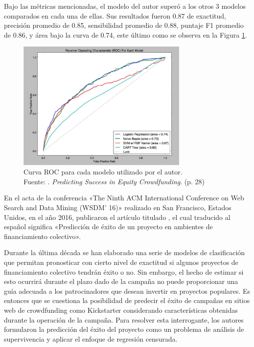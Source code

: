 Bajo las métricas mencionadas, el modelo del autor superó a los otros 3 modelos comparados en cada una de ellas. Sus resultados fueron 0.87 de exactitud, precisión promedio de 0.85, sensibilidad promedio de 0.88, puntaje F1 promedio de 0.86, y área bajo la curva de 0.74, este último como se observa en la Figura \ref{2:fig115}.

\begin{figure}[!ht]
	\begin{center}
		\includegraphics[width=0.75\textwidth]{2/figures/beckwith2016.jpg}
		\caption[Curva ROC para cada modelo utilizado por el autor]{Curva ROC para cada modelo utilizado por el autor.\\
		Fuente: \cite{pr_beckwith2016predcrowd}. \textit{Predicting Success in Equity Crowdfunding}. (p. 28)}
		\label{2:fig115}
	\end{center}
\end{figure}

\clearpage
En el acta de la conferencia «The Ninth ACM International Conference on Web Search and Data Mining (WSDM’ 16)» realizado en San Francisco, Estados Unidos, en el año 2016, \cite{pr_li2016predcrowd} publicaron el artículo titulado , el cual traducido al español significa «Predicción de éxito de un proyecto en ambientes de financiamiento colectivo».

Durante la última década se han elaborado una serie de modelos de clasificación que permitan pronosticar con cierto nivel de exactitud si algunos proyectos de financiamiento colectivo tendrán éxito o no. Sin embargo, el hecho de estimar si esto ocurrirá durante el plazo dado de la campaña no puede proporcionar una guía adecuada a los patrocinadores que desean invertir en proyectos populares. Es entonces que se cuestiona la posibilidad de predecir el éxito de campañas en sitios web de crowdfunding como Kickstarter considerando características obtenidas durante la operación de la campaña. Para resolver esta interrogante, los autores formularon la predicción del éxito del proyecto como un problema de análisis de supervivencia y aplicar el enfoque de regresión censurada.

